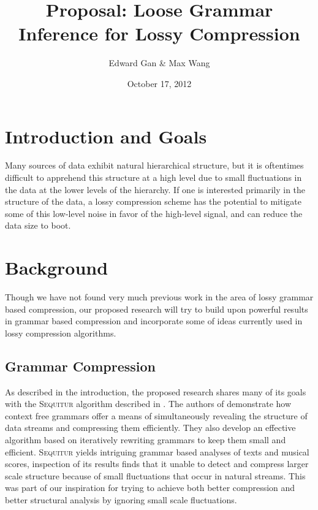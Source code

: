 \documentclass[11pt]{article}
\newcommand{\Sequitur}{\textsc{Sequitur}\xspace}
\begin{document}


\title{Proposal: Loose Grammar Inference for Lossy Compression}
\author{Edward Gan \& Max Wang}
\date{October 17, 2012}
\maketitle

\section{Introduction and Goals}

Many sources of data exhibit natural hierarchical structure, but it is
oftentimes difficult to apprehend this structure at a high level due to small
fluctuations in the data at the lower levels of the hierarchy.  If one is
interested primarily in the structure of the data, a lossy compression scheme
has the potential to mitigate some of this low-level noise in favor of the
high-level signal, and can reduce the data size to boot.

\section{Background}

Though we have not found very much previous work in the area of lossy grammar
based compression, our proposed research will try to build upon powerful
results in grammar based compression and incorporate some of ideas currently
used in lossy compression algorithms.

\subsection{Grammar Compression}

As described in the introduction, the proposed research shares many of its
goals with the \Sequitur algorithm described in \cite{sequitur}.  The authors
of \cite{sequitur} demonstrate how context free grammars offer a means of
simultaneously revealing the structure of data streams and compressing them
efficiently.  They also develop an effective algorithm based on iteratively
rewriting grammars to keep them small and efficient. \Sequitur yields
intriguing grammar based analyses of texts and musical scores, inspection of
its results finds that it unable to detect and compress larger scale structure
because of small fluctuations that occur in natural streams.  This was part of
our inspiration for trying to achieve both better compression and better
structural analysis by ignoring small scale fluctuations.
\end{document}
